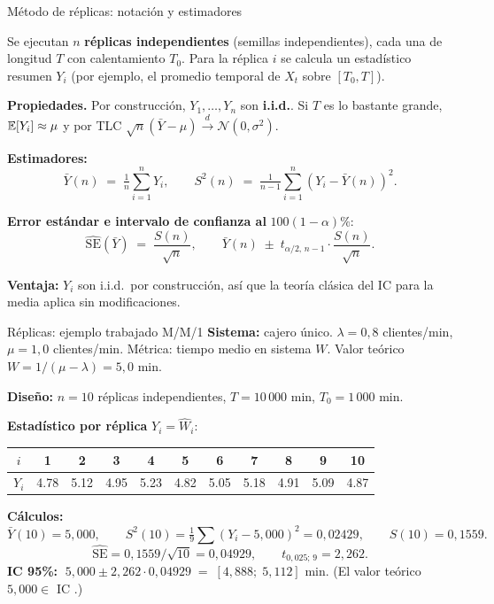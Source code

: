 \documentclass[aspectratio=1610, 10pt]{beamer}
\begin{document}
\begin{frame}{Método de réplicas: notación y estimadores}
\begin{definicionbox}
Se ejecutan $n$ \textbf{réplicas independientes} (semillas independientes), cada una de longitud $T$ con calentamiento $T_0$. Para la réplica $i$ se calcula un estadístico resumen $Y_i$ (por ejemplo, el promedio temporal de $X_t$ sobre $[T_0, T]$).
\end{definicionbox}

\vspace{0.2cm}
\textbf{Propiedades.} Por construcción, $Y_1, \ldots, Y_n$ son \textbf{i.i.d.}. Si $T$ es lo bastante grande, $\mathbb{E}[Y_i] \approx \mu$ y por TLC $\sqrt{n}(\bar Y - \mu) \xrightarrow{d} \mathcal{N}(0,\sigma^2)$.

\vspace{0.2cm}
\textbf{Estimadores:}
\[
\bar Y(n) \;=\; \tfrac{1}{n}\textstyle\sum_{i=1}^{n} Y_i,
\qquad
S^2(n) \;=\; \tfrac{1}{n-1}\textstyle\sum_{i=1}^{n} (Y_i - \bar Y(n))^2.
\]

\textbf{Error estándar e intervalo de confianza al} $100(1-\alpha)\%$:
\[
\widehat{\mathrm{SE}}(\bar Y) \;=\; \frac{S(n)}{\sqrt{n}},
\qquad
\bar Y(n) \;\pm\; t_{\alpha/2,\,n-1}\cdot\frac{S(n)}{\sqrt{n}}.
\]

\textbf{Ventaja:} $Y_i$ son i.i.d.\ por construcción, así que la teoría clásica del IC para la media aplica sin modificaciones.
\end{frame}

\begin{frame}{Réplicas: ejemplo trabajado M/M/1}
\textbf{Sistema:} cajero único. $\lambda=0{,}8$ clientes/min, $\mu=1{,}0$ clientes/min. Métrica: tiempo medio en sistema $W$. Valor teórico $W = 1/(\mu-\lambda) = 5{,}0$ min.

\vspace{0.1cm}
\textbf{Diseño:} $n=10$ réplicas independientes, $T=10\,000$ min, $T_0=1\,000$ min.

\vspace{0.2cm}
\textbf{Estadístico por réplica} $Y_i = \widehat W_i$:
\begin{table}
\centering
\small
\begin{tabular}{c|cccccccccc}
\toprule
$i$ & 1 & 2 & 3 & 4 & 5 & 6 & 7 & 8 & 9 & 10 \\
\midrule
$Y_i$ & 4.78 & 5.12 & 4.95 & 5.23 & 4.82 & 5.05 & 5.18 & 4.91 & 5.09 & 4.87 \\
\bottomrule
\end{tabular}
\end{table}

\vspace{0.1cm}
\textbf{Cálculos:}
\[
\bar Y(10) = 5{,}000, \qquad S^2(10) = \tfrac{1}{9}\textstyle\sum (Y_i-5{,}000)^2 = 0{,}02429, \qquad S(10) = 0{,}1559.
\]
\[
\widehat{\mathrm{SE}} = 0{,}1559/\sqrt{10} = 0{,}04929, \qquad t_{0{,}025;\,9} = 2{,}262.
\]
\textbf{IC 95\%:} $\;5{,}000 \pm 2{,}262\cdot 0{,}04929 \;=\; [4{,}888;\; 5{,}112]$ min. \quad (El valor teórico $5{,}000 \in$ IC \textcolor{deepgreen}{\checkmark}.)
\end{frame}
\end{document}
